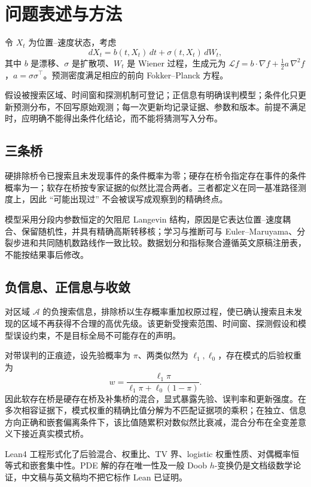 \documentclass[UTF8,11pt]{ctexart}
\newcommand{\Aregion}{\mathcal{A}}
\begin{document}
\section{问题表述与方法}
令 $X_t$ 为位置--速度状态，考虑
\begin{equation}
dX_t=b(t,X_t)\,dt+\sigma(t,X_t)\,dW_t,
\end{equation}
其中 $b$ 是漂移、$\sigma$ 是扩散项、$W_t$ 是 Wiener 过程，生成元为 $\mathcal Lf=b\cdot\nabla f+\tfrac12 a\,\nabla^2f$，$a=\sigma\sigma^\top$。预测密度满足相应的前向 Fokker--Planck 方程。

假设被搜索区域、时间窗和探测机制可登记；正信息有明确误判模型；条件化只更新预测分布，不回写原始观测；每一次更新均记录证据、参数和版本。前提不满足时，应明确不能得出条件化结论，而不能将猜测写入分布。

\subsection{三条桥}
硬排除桥令已搜索且未发现事件的条件概率为零；硬存在桥令指定存在事件的条件概率为一；软存在桥按专家证据的似然比混合两者。三者都定义在同一基准路径测度上，因此 ``可能出现过'' 不会被误写成观察到的精确终点。

模型采用分段内参数恒定的欠阻尼 Langevin 结构，原因是它表达位置--速度耦合、保留随机性，并具有精确高斯转移核；学习与推断可与 Euler--Maruyama、分裂步进和共同随机数路线作一致比较。数据划分和指标聚合遵循英文原稿注册表，不能按结果事后修改。

\subsection{负信息、正信息与收敛}
对区域 $\Aregion$ 的负搜索信息，排除桥以生存概率重加权原过程，使已确认搜索且未发现的区域不再获得不合理的高优先级。该更新受搜索范围、时间窗、探测假设和模型误设约束，不是目标全局不可能存在的声明。

对带误判的正痕迹，设先验概率为 $\pi$、两类似然为 $\ell_1,\ell_0$，存在模式的后验权重为
\begin{equation}
w=\frac{\ell_1\pi}{\ell_1\pi+\ell_0(1-\pi)}.
\end{equation}
因此软存在桥是硬存在桥及补集桥的混合，显式暴露先验、误判率和更新强度。在多次相容证据下，模式权重的精确比值分解为不匹配证据项的乘积；在独立、信息方向正确和嵌套偏离条件下，该比值随累积对数似然比衰减，混合分布在全变差意义下接近真实模式桥。

Lean4 工程形式化了后验混合、权重比、TV 界、logistic 权重性质、对偶概率恒等式和嵌套集中性。PDE 解的存在唯一性及一般 Doob $h$-变换仍是文档级数学论证，中文稿与英文稿均不把它标作 Lean 已证明。
\end{document}
